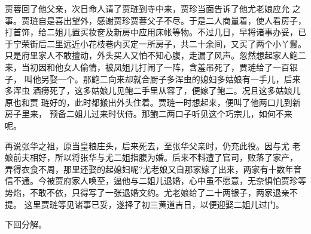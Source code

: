 贾蓉回了他父亲，次日命人请了贾琏到寺中来，贾珍当面告诉了他尤老娘应允
之事。贾琏自是喜出望外，感谢贾珍贾蓉父子不尽。于是二人商量着，使人看房子，
打首饰，给二姐儿置买妆奁及新房中应用床帐等物。不过几日，早将诸事办妥，已
于宁荣街后二里远近小花枝巷内买定一所房子，共二十余间，又买了两个小丫鬟。
只是府里家人不敢擅动，外头买人又怕不知心腹，走漏了风声。忽然想起家人鲍二
来，当初因和他女人偷情，被凤姐儿打闹了一阵，含羞吊死了，贾琏给了一百银子，
叫他另娶一个。那鲍二向来却就合厨子多浑虫的媳妇多姑娘有一手儿，后来多浑虫
酒痨死了，这多姑娘儿见鲍二手里从容了，便嫁了鲍二。况且这多姑娘儿原也和贾
琏好的，此时都搬出外头住着。贾琏一时想起来，便叫了他两口儿到新房子里来，
预备二姐儿过来时伏侍。那鲍二两口子听见这个巧宗儿，如何不来呢。

再说张华之祖，原当皇粮庄头，后来死去，至张华父亲时，仍充此役。因与尤
老娘前夫相好，所以将张华与尤二姐指腹为婚。后来不料遭了官司，败落了家产，
弄得衣食不周，那里还娶的起媳妇呢?尤老娘又自那家嫁了出来，两家有十数年音
信不通。今被贾府家人唤至，逼他与二姐儿退婚，心中虽不愿意，无奈惧怕贾珍等
势焰，不敢不依，只得写了一张退婚文约。尤老娘给了二十两银子，两家退亲不提。
这里贾琏等见诸事已妥，遂择了初三黄道吉日，以便迎娶二姐儿过门。

下回分解。